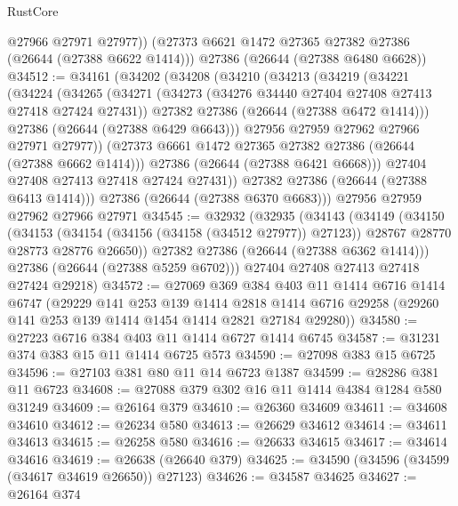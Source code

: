 \begin{lexlean}{RustCore}
\begin{coremodule}
        @27966
        @27971
        @27977))
    (@27373 @6621 @1472 @27365 @27382 @27386 (@26644 (@27388 @6622 @1414)))
    @27386
    (@26644 (@27388 @6480 @6628))
@34512 := @34161
    (@34202
      (@34208
        (@34210
          (@34213
            (@34219
              (@34221
                (@34224
                  (@34265
                    (@34271
                      (@34273 (@34276 @34440 @27404 @27408 @27413 @27418 @27424 @27431))
                      @27382
                      @27386
                      (@26644 (@27388 @6472 @1414)))
                    @27386
                    (@26644 (@27388 @6429 @6643)))
                  @27956
                  @27959
                  @27962
                  @27966
                  @27971
                  @27977))
              (@27373 @6661 @1472 @27365 @27382 @27386 (@26644 (@27388 @6662 @1414)))
              @27386
              (@26644 (@27388 @6421 @6668)))
            @27404
            @27408
            @27413
            @27418
            @27424
            @27431))
        @27382
        @27386
        (@26644 (@27388 @6413 @1414)))
      @27386
      (@26644 (@27388 @6370 @6683)))
    @27956
    @27959
    @27962
    @27966
    @27971
@34545 := @32932
    (@32935
      (@34143
        (@34149
          (@34150
            (@34153
              (@34154 (@34156 (@34158 (@34512 @27977)) @27123))
              @28767
              @28770
              @28773
              @28776
              @26650))
          @27382
          @27386
          (@26644 (@27388 @6362 @1414)))
        @27386
        (@26644 (@27388 @5259 @6702)))
      @27404
      @27408
      @27413
      @27418
      @27424
      @29218)
@34572 := @27069
    @369
    @384
    @403
    @11
    @1414
    @6716
    @1414
    @6747
    (@29229
      @141
      @253
      @139
      @1414
      @2818
      @1414
      @6716
      @29258
      (@29260 @141 @253 @139 @1414 @1454 @1414 @2821 @27184 @29280))
@34580 := @27223 @6716 @384 @403 @11 @1414 @6727 @1414 @6745
@34587 := @31231 @374 @383 @15 @11 @1414 @6725 @573
@34590 := @27098 @383 @15 @6725
@34596 := @27103 @381 @80 @11 @14 @6723 @1387
@34599 := @28286 @381 @11 @6723
@34608 := @27088 @379 @302 @16 @11 @1414 @4384 @1284 @580 @31249
@34609 := @26164 @379
@34610 := @26360 @34609
@34611 := @34608 @34610
@34612 := @26234 @580
@34613 := @26629 @34612
@34614 := @34611 @34613
@34615 := @26258 @580
@34616 := @26633 @34615
@34617 := @34614 @34616
@34619 := @26638 (@26640 @379)
@34625 := @34590 (@34596 (@34599 (@34617 @34619 @26650)) @27123)
@34626 := @34587 @34625
@34627 := @26164 @374

\end{coremodule}
\end{lexlean}
